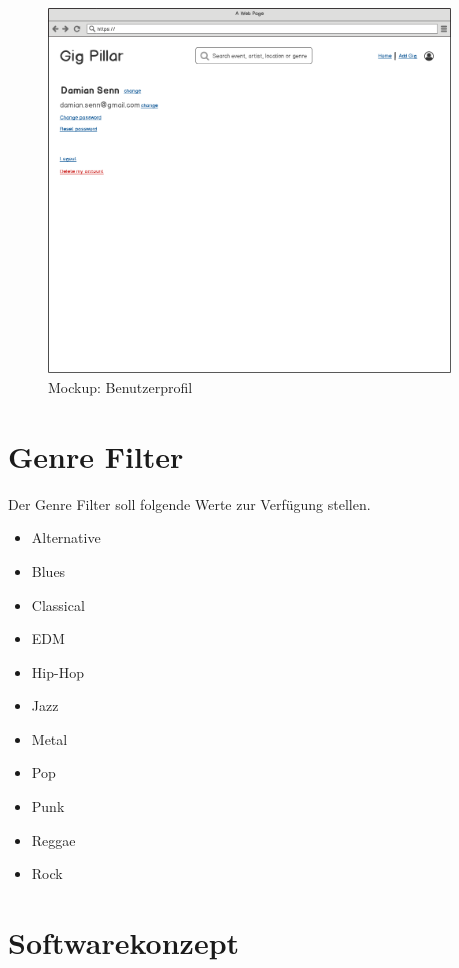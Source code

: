 \begin{figure}[!htb]
  \centering
  \includegraphics[width=0.95\textwidth]{mockups/profile.png}
  \caption{Mockup: Benutzerprofil}
\end{figure}

\clearpage
\section{Genre Filter}\label{genrefilter}

Der Genre Filter soll folgende Werte zur Verfügung stellen.

\begin{itemize}
  \item{} Alternative
  \item{} Blues
  \item{} Classical
  \item{} EDM
  \item{} Hip-Hop
  \item{} Jazz
  \item{} Metal
  \item{} Pop
  \item{} Punk
  \item{} Reggae
  \item{} Rock
\end{itemize}

\clearpage
\section{Softwarekonzept}\label{softwarekonzept}
